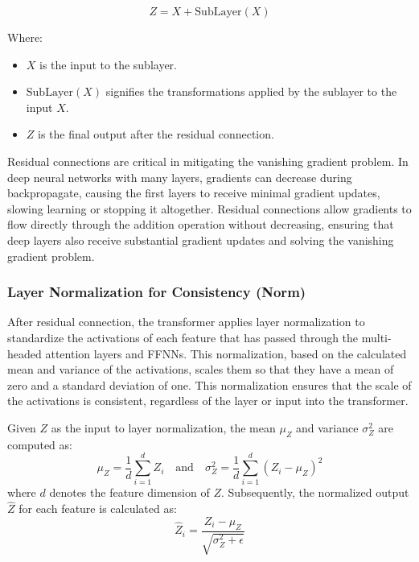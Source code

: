 \begin{itemize}
\begin{equation}
    Z = X + \text{SubLayer}(X)
\end{equation}

Where:
\begin{itemize}
    \item \(X\) is the input to the sublayer.
    \item \(\text{SubLayer}(X)\) signifies the transformations applied by the sublayer to the input \(X\).
    \item \(Z\) is the final output after the residual connection.
\end{itemize}

Residual connections are critical in mitigating the vanishing gradient problem. In deep neural networks with many layers, gradients can decrease during backpropagate, causing the first layers to receive minimal gradient updates, slowing learning or stopping it altogether. Residual connections allow gradients to flow directly through the addition operation without decreasing, ensuring that deep layers also receive substantial gradient updates and solving the vanishing gradient problem.

\subsubsection{Layer Normalization for Consistency (Norm)}

After residual connection, the transformer applies layer normalization to standardize the activations of each feature that has passed through the multi-headed attention layers and FFNNs. This normalization, based on the calculated mean and variance of the activations, scales them so that they have a mean of zero and a standard deviation of one. This normalization ensures that the scale of the activations is consistent, regardless of the layer or input into the transformer.

Given \( Z \) as the input to layer normalization, the mean \( \mu_Z \) and variance \( \sigma_Z^2 \) are computed as:
\begin{equation}
\mu_Z = \frac{1}{d} \sum_{i=1}^{d} Z_i \quad \text{and} \quad \sigma_Z^2 = \frac{1}{d} \sum_{i=1}^{d} (Z_i - \mu_Z)^2
\end{equation}
where \( d \) denotes the feature dimension of \( Z \). Subsequently, the normalized output \( \hat{Z} \) for each feature is calculated as:
\begin{equation}
\hat{Z}_i = \frac{Z_i - \mu_Z}{\sqrt{\sigma_Z^2 + \epsilon}}
\end{equation}


\end{itemize}
